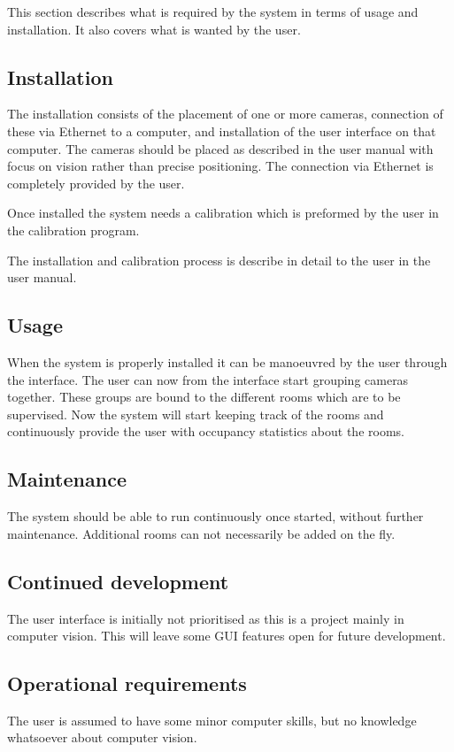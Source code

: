 This section describes what is required by the system in terms of usage and installation. It also covers what is wanted by the user. 

\subsection{Installation}
The installation consists of the placement of one or more cameras, connection of these via Ethernet to a computer, and installation of the user interface on that computer. The cameras should be placed as described in the user manual with focus on vision rather than precise positioning. The connection via Ethernet is completely provided by the user.     

Once installed the system needs a calibration which is preformed by the user in the calibration program.

The installation and calibration process is describe in detail to the user in the user manual.

\subsection{Usage}
When the system is properly installed it can be manoeuvred by the user through the interface. The user can now from the interface start grouping cameras together. These groups are bound to the different rooms which are to be supervised. Now the system will start keeping track of the rooms and continuously provide the user with occupancy statistics about the rooms. 

\subsection{Maintenance}
The system should be able to run continuously once started, without further maintenance. Additional rooms can not necessarily be added on the fly. 

\subsection{Continued development}
The user interface is initially not prioritised as this is a project mainly in computer vision. This will leave some GUI features open for future development. 

\subsection{Operational requirements}
The user is assumed to have some minor computer skills, but no knowledge whatsoever about computer vision. 


\label{sec:ui_req}
\reqtable
{
}
